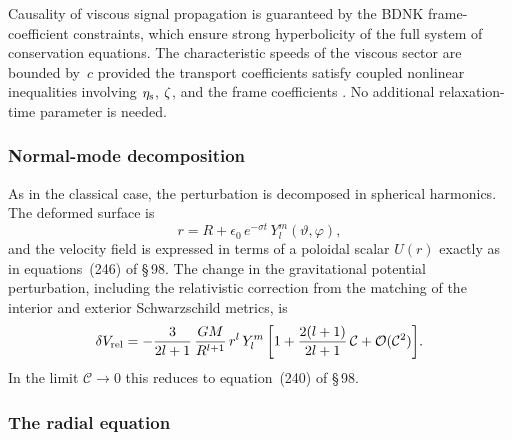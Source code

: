 \begin{causalitycheck}
Causality of viscous signal propagation is guaranteed by the BDNK
frame-coefficient constraints, which ensure strong hyperbolicity
of the full system of conservation equations.  The characteristic
speeds of the viscous sector are bounded by~$c$ provided the
transport coefficients satisfy coupled nonlinear inequalities
involving $\eta_{\mathrm{s}}$, $\zeta$, and the frame coefficients
\citep{BemficaDN2018,Kovtun2019}.  No additional relaxation-time
parameter is needed.
\end{causalitycheck}

\subsubsection*{Normal-mode decomposition}

As in the classical case, the perturbation is decomposed in spherical
harmonics.  The deformed surface is
\begin{equation}\label{eq:rel-10-239R}
  r = R + \epsilon_{0}\,e^{-\sigma t}\,Y_{l}^{m}(\vartheta,\varphi),
\end{equation}
and the velocity field is expressed in terms of a poloidal scalar
$U(r)$ exactly as in equations~(246) of \S\,98.  The change in the
gravitational potential perturbation, including the relativistic
correction from the matching of the interior and exterior
Schwarzschild metrics, is
\begin{equation}\label{eq:rel-10-240R}
  \delta V_{\mathrm{rel}}
  = -\frac{3}{2l+1}\,\frac{GM}{R^{l+1}}\,r^{l}\,Y_{l}^{m}
    \left[1 + \frac{2(l+1)}{2l+1}\,\mathcal{C}
          + \mathcal{O}(\mathcal{C}^{2})\right]\!.
\end{equation}
In the limit $\mathcal{C}\to 0$ this reduces to
equation~(240) of \S\,98.

\subsubsection*{The radial equation}

